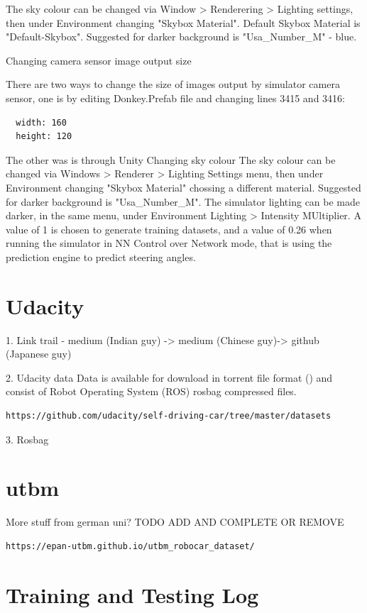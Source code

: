 The sky colour can be changed via Window > Renderering > Lighting settings, then under Environment changing "Skybox Material". Default Skybox Material is "Default-Skybox". Suggested for darker background is "Usa\_Number\_M" - blue.

Changing camera sensor image output size

There are two ways to change the size of images output by simulator camera sensor, one is by editing Donkey.Prefab file and changing lines 3415 and 3416:
\begin{verbatim}
  width: 160
  height: 120
\end{verbatim}
The other was is through Unity
Changing sky colour
The sky colour can be changed via Windows > Renderer > Lighting Settings menu, then under Environment changing "Skybox Material" chossing a different material.  Suggested for darker background is "Usa\_Number\_M".
The simulator lighting can be made darker, in the same menu, under Environment Lighting > Intensity MUltiplier. A value of 1 is chosen to generate training datasets, and a value of 0.26 when running the simulator in NN Control over Network mode, that is using the prediction engine to predict steering angles.
\section{Udacity}

1. Link trail - medium (Indian guy) -> medium (Chinese guy)-> github (Japanese guy)  
  
2. Udacity data  
Data is available for download in torrent file format (\cite{torrentCite}) and consist of Robot Operating System (ROS) rosbag compressed files.

\begin{verbatim}
https://github.com/udacity/self-driving-car/tree/master/datasets
\end{verbatim}
3. Rosbag

\section{utbm}
More stuff from german uni? TODO ADD AND COMPLETE OR REMOVE
\begin{verbatim}
https://epan-utbm.github.io/utbm_robocar_dataset/
\end{verbatim}

\section{Training and Testing Log}

